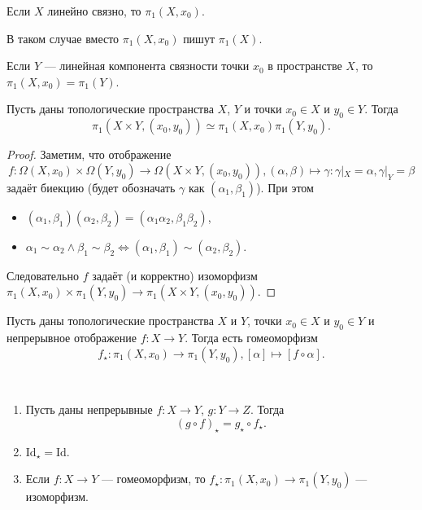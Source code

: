 \documentclass[12pt,a4paper]{article}
\newcommand{\Id}{\ensuremath{\mathrm{Id}}\xspace}
\begin{document}
    \begin{corollary}
        Если $X$ линейно связно, то $\pi_1(X, x_0)$.
    \end{corollary}

    \begin{remark}
        В таком случае вместо $\pi_1(X, x_0)$ пишут $\pi_1(X)$.
    \end{remark}

    \begin{remark}
        Если $Y$ --- линейная компонента связности точки $x_0$ в пространстве $X$, то $\pi_1(X, x_0) = \pi_1(Y)$.
    \end{remark}

    \begin{theorem}
        Пусть даны топологические пространства $X$, $Y$ и точки $x_0 \in X$ и $y_0 \in Y$. Тогда
        \[\pi_1(X \times Y, (x_0, y_0)) \simeq \pi_1(X, x_0) \pi_1(Y, y_0).\]
    \end{theorem}

    \begin{proof}
        Заметим, что отображение
        \[f: \Omega(X, x_0) \times \Omega(Y, y_0) \to \Omega(X \times Y, (x_0, y_0)), (\alpha, \beta) \mapsto \gamma: \gamma|_X = \alpha, \gamma|_Y = \beta\]
        задаёт биекцию (будет обозначать $\gamma$ как $(\alpha_1, \beta_1)$). При этом
        \begin{itemize}
            \item $(\alpha_1, \beta_1)(\alpha_2, \beta_2) = (\alpha_1\alpha_2, \beta_1\beta_2)$,
            \item $\alpha_1 \sim \alpha_2 \wedge \beta_1 \sim \beta_2 \Longleftrightarrow (\alpha_1, \beta_1) \sim (\alpha_2, \beta_2)$.
        \end{itemize}
        Следовательно $f$ задаёт (и корректно) изоморфизм $\pi_1(X, x_0) \times \pi_1(Y, y_0) \to \pi_1(X \times Y, (x_0, y_0))$.
    \end{proof}

    \begin{definition}
        Пусть даны топологические пространства $X$ и $Y$, точки $x_0 \in X$ и $y_0 \in Y$ и непрерывное отображение $f: X \to Y$. Тогда есть гомеоморфизм
        \[f_\star: \pi_1(X, x_0) \to \pi_1(Y, y_0), [\alpha] \mapsto [f \circ \alpha].\]
    \end{definition}

    \begin{lemma}\ 
        \begin{enumerate}
            \item Пусть даны непрерывные $f: X \to Y$, $g: Y \to Z$. Тогда
                \[(g \circ f)_\star = g_\star \circ f_\star.\]
            \item $\Id_\star = \Id$.
            \item Если $f: X \to Y$ --- гомеоморфизм, то $f_\star: \pi_1(X, x_0) \to \pi_1(Y, y_0)$ --- изоморфизм.
        \end{enumerate}
    \end{lemma}
\end{document}
